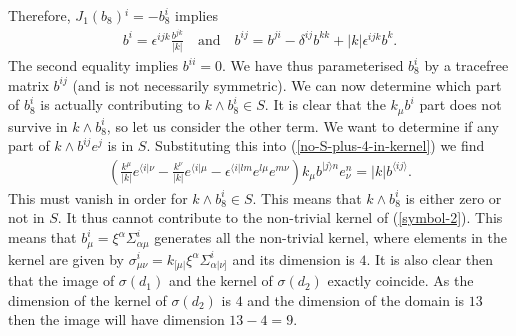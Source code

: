 \documentclass[10pt]{report}
\theoremstyle{definition}
\begin{document}
Therefore, $J_1(b_8){}^i = -b^i_8$ implies
\begin{align}
 b^i =  \epsilon^{ijk} \frac{b^{jk}}{|k|} \quad \textrm{and} \quad b^{ij} = b^{ji} - \delta^{ij} b^{kk} + |k| \epsilon^{ijk} b^k.
\end{align}
The second equality implies $b^{ii}=0$. We have thus parameterised $b^i_8$ by a tracefree matrix $b^{ij}$ (and is not necessarily symmetric).  We can now determine which part of $b^i_8$ is actually contributing to $k\wedge b^i_8\in S$. It is clear that the $k_\mu b^i$ part does not survive in $k\wedge b^i_8$, so let us consider the other term. We want to determine if any part of $k\wedge b^{ij} e^j$ is in $S$. Substituting this into (\ref{no-S-plus-4-in-kernel}) we find 
\begin{align}
\left(\frac{k^\mu}{|k|} e^{\langle i|\nu} - \frac{k^\nu}{|k|} e^{\langle i|\mu} - \epsilon^{\langle i|lm} e^{l\mu} e^{m\nu} \right) k_\mu b^{|j\rangle n} e^n_\nu = |k| b^{\langle ij\rangle }.
\end{align}
This must vanish in order for $k\wedge b^i_8\in S$. This means that $k\wedge b^i_8$ is either zero or not in $S$. It thus cannot contribute to the non-trivial kernel of (\ref{symbol-2}). This means that $b^i_\mu = \xi^\alpha \Sigma^i_{\alpha\mu}$ generates all the non-trivial kernel, where elements in the kernel are given by $\sigma^i_{\mu\nu} = k_{[\mu|} \xi^\alpha \Sigma^i_{\alpha |\nu]}$ and its dimension is $4$.
It is also clear then that the image of $\sigma(d_1)$ and the kernel of $\sigma(d_2)$ exactly coincide. 
As the dimension of the kernel of $\sigma(d_2)$ is $4$ and the dimension of the domain is $13$ then the image will have dimension $13-4 = 9$.
\end{document}
